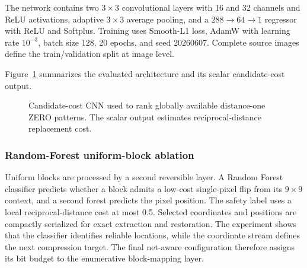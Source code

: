 \documentclass[a4paper,fleqn]{cas-dc}
\newcommand{\RevisionAddBegin}{\begingroup\color{revisionblue}}
\newcommand{\RevisionAddEnd}{\endgroup}
\begin{document}
The network contains two $3\times3$ convolutional layers with 16 and 32
channels and ReLU activations, adaptive $3\times3$ average pooling, and a
$288\rightarrow64\rightarrow1$ regressor with ReLU and Softplus. Training uses
Smooth-L1 loss, AdamW with learning rate $10^{-3}$, batch size 128, 20 epochs,
\RevisionAddBegin
and seed 20260607. Complete source images define the train/validation split at
image level.
\RevisionAddEnd

Figure~\ref{fig:cnn-architecture} summarizes the evaluated architecture and
its scalar candidate-cost output.

\begin{figure}[t]
\centering
{}
\caption{Candidate-cost CNN used to rank globally available distance-one ZERO
patterns. The scalar output estimates reciprocal-distance replacement cost.}
\label{fig:cnn-architecture}
\end{figure}

\subsubsection*{Random-Forest uniform-block ablation}
\label{subsec:rf-layer}

Uniform blocks are processed by a second reversible layer. A Random Forest
classifier predicts whether a block admits a low-cost single-pixel flip from
its $9\times9$ context, and a second forest predicts the pixel position. The
\RevisionAddBegin
safety label uses a local reciprocal-distance cost at most 0.5.
\RevisionAddEnd
Selected coordinates and positions are compactly serialized for exact
extraction and restoration. The experiment shows that the classifier
identifies reliable locations, while the coordinate stream defines the next
compression target. The final net-aware configuration therefore assigns its
bit budget to the enumerative block-mapping layer.
\end{document}
